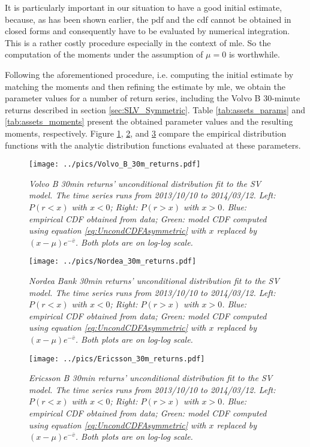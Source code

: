 It is particularly important in our situation to have a good initial
estimate, because, as has been shown earlier, the \gls{pdf} and the
\gls{cdf} cannot be obtained in closed forms and consequently have to
be evaluated by numerical integration. This is a rather costly
procedure especially in the context of \gls{mle}. So the computation of the
moments under the assumption of $\mu = 0$ is worthwhile.

Following the aforementioned procedure, i.e. computing the initial
estimate by matching the moments and then refining the estimate by
\gls{mle}, we obtain the parameter values for a number of return series,
including the Volvo B 30-minute returns described in
section \ref{sec:SLV_Symmetric}. Table \ref{tab:assets_params} and
\ref{tab:assets_moments} present the obtained parameter values and the
resulting moments, respectively. Figure \ref{fig:Volvo_B_30m_returns},
\ref{fig:Nordea_30m_returns}, and \ref{fig:Ericsson_30m_returns}
compare the empirical distribution functions with the analytic
distribution functions evaluated at these parameters.
\begin{figure}[htb!]
  \centering
  \texttt{[image: ../pics/Volvo\_B\_30m\_returns.pdf]}
  \caption{\small \it Volvo B 30min returns' unconditional distribution fit to
    the SV model. The time series runs from
    2013/10/10 to 2014/03/12. Left: $P(r < x)$ with $x < 0$; Right:
    $P(r > x)$ with $x > 0$. Blue: empirical CDF obtained from data;
    Green: model CDF computed using equation
    \ref{eq:UncondCDFAsymmetric} with $x$ replaced by
    $(x-\mu)e^{-\bar{v}}$. Both plots are on log-log scale.}
  \label{fig:Volvo_B_30m_returns}
\end{figure}
\begin{figure}[htb!]
  \centering
  \texttt{[image: ../pics/Nordea\_30m\_returns.pdf]}
  \caption{\small \it Nordea Bank 30min returns' unconditional
    distribution fit to the SV model. The time
    series runs from 2013/10/10 to 2014/03/12. Left: $P(r < x)$ with
    $x < 0$; Right: $P(r > x)$ with $x > 0$. Blue: empirical CDF
    obtained from data; Green: model CDF computed using equation
    \ref{eq:UncondCDFAsymmetric} with $x$ replaced by
    $(x-\mu)e^{-\bar{v}}$. Both plots are on log-log scale.}
  \label{fig:Nordea_30m_returns}
\end{figure}
\begin{figure}[htb!]
  \centering
  \texttt{[image: ../pics/Ericsson\_30m\_returns.pdf]}
  \caption{\small \it Ericsson B 30min returns' unconditional
    distribution fit to the SV model. The time
    series runs from 2013/10/10 to 2014/03/12. Left: $P(r < x)$ with
    $x < 0$; Right: $P(r > x)$ with $x > 0$. Blue: empirical CDF
    obtained from data; Green: model CDF computed using equation
    \ref{eq:UncondCDFAsymmetric} with $x$ replaced by
    $(x-\mu)e^{-\bar{v}}$. Both plots are on log-log scale.}
  \label{fig:Ericsson_30m_returns}
\end{figure}
